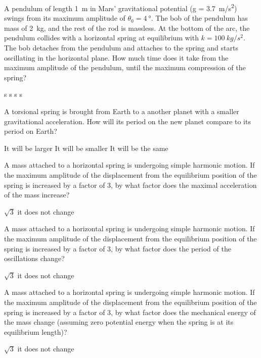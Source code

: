 \question A pendulum of length \SI{1}{m} in Mars' gravitational potential (g = \SI{3.7}{m/s^2}) swings from its maximum amplitude of $\theta_0 = \SI{4}{\degree}$.  The bob of the pendulum has mass of \SI{2}{kg}, and the rest of the rod is massless.  At the bottom of the arc, the pendulum collides with a horizontal spring at equilibrium with $k=\SI{100}{kg/s^2}$.  The bob detaches from the pendulum and attaches to the spring and starts oscillating in the horizontal plane.  How much time does it take from the maximum amplitude of the pendulum, until the maximum compression of the spring?  
\begin{checkboxes}
 s 
 s\correct
{} s
 s
\end{checkboxes}


\question A torsional spring is brought from Earth to a another planet with a smaller gravitational acceleration. How will its period on the new planet compare to its period on Earth?
\begin{checkboxes}
\choice It will be larger
\choice It will be smaller
\CorrectChoice It will be the same \correct
\end{checkboxes}

\question A mass attached to a horizontal spring is undergoing simple harmonic motion. If the maximum amplitude of the displacement from the equilibrium position of the spring is increased by a factor of 3, by what factor does the maximal acceleration of the mass increase?
\begin{checkboxes}
\choice $\sqrt{3}$
 \correct
{}
\choice it does not change
\end{checkboxes}

\question A mass attached to a horizontal spring is undergoing simple harmonic motion. If the maximum amplitude of the displacement from the equilibrium position of the spring is increased by a factor of 3, by what factor does the period of the oscillations change?
\begin{checkboxes}
\choice $\sqrt{3}$
\CorrectChoice it does not change \correct
\end{checkboxes}

\question A mass attached to a horizontal spring is undergoing simple harmonic motion. If the maximum amplitude of the displacement from the equilibrium position of the spring is increased by a factor of 3, by what factor does the mechanical energy of the mass change (assuming zero potential energy when the spring is at its equilibrium length)?
\begin{checkboxes}
\choice $\sqrt{3}$
 \correct
\choice it does not change
\end{checkboxes}

